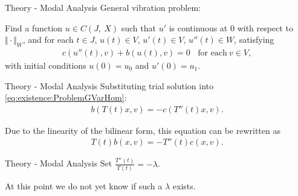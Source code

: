 \documentclass{beamer}
\begin{document}
\begin{frame}{Theory - Modal Analysis}
    General vibration problem:

    Find a function $u \in C(J,\ X)$ such that $u'$ is continuous at $0$ with respect to $\Vert \cdot \Vert_{W}$, and for each $t \in J$, $u(t) \in V$, $u'(t) \in V$, $u''(t) \in W$, satisfying
    \begin{eqnarray}
        c(u''(t),v)+b(u(t),v) = 0 \ \ \ \ \textrm{for each} \ v \in V, \label{eq:existence:ProblemGVarHom}
    \end{eqnarray}
    with initial conditions $u(0) = u_0$ and $u'(0) = u_1$.

\end{frame}

\begin{frame}{Theory - Modal Analysis}
   Substituting trial solution into \eqref{eq:existence:ProblemGVarHom}:
   \begin{eqnarray*}
	    b(T(t)x,v) = - c(T''(t)x,v).  \label{eq:existence:ProblemGVarHom:Substitution}
    \end{eqnarray*}

    Due to the linearity of the bilinear form, this equation can be rewritten as
    \begin{eqnarray*}
        T(t)b(x,v) = - T''(t)c(x,v).
    \end{eqnarray*}


\end{frame}

\begin{frame}{Theory - Modal Analysis}
    Set $\displaystyle \frac{T''(t)}{T(t)} = -\lambda$.

    At this point we do not yet know if such a $\lambda$ exists.


 \end{frame}
\end{document}
